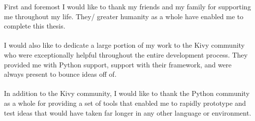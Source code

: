 First and foremost I would like to thank my friends and my family for supporting me throughout my life. They/ greater humanity as a whole have enabled me to complete this thesis.
\\
\\
I would also like to dedicate a large portion of my work to the Kivy community who were exceptionally helpful throughout the entire development process. They provided me with Python support, support with their framework, and were always present to bounce ideas off of. 
\\
\\
In addition to the Kivy community, I would like to thank the Python community as a whole for providing a set of tools that enabled me to rapidly prototype and test ideas that would have taken far longer in any other language or environment.

